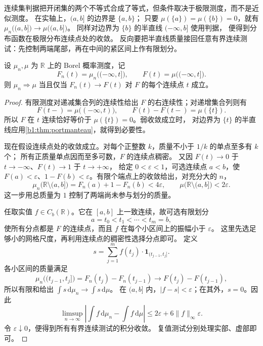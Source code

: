 连续集判据把开闭集的两个不等式合成了等式，但条件取决于极限测度，而不是近似测度。
在实轴上，\((a,b]\) 的边界是 \(\{a,b\}\)；
只要 \(\mu(\{a\})=\mu(\{b\})=0\)，就有
\(\mu_n\bigl((a,b]\bigr)\to\mu\bigl((a,b]\bigr)\)。
同样对边界为 \(\{b\}\) 的半直线 \(( -\infty,b]\) 使用判据，
便得到分布函数在极限分布连续点处的收敛。
反向要把半直线质量接回任意有界连续测试：先控制两端尾部，再在中间的紧区间上作有限划分。

\begin{proposition}[实轴上的分布函数判据]\label{b1:prop:cdf-weak-convergence}
设 \(\mu_n,\mu\) 为 \(\mathbb R\) 上的 Borel 概率测度，记
\[
 F_n(t)=\mu_n\bigl((-\infty,t]\bigr),\qquad
 F(t)=\mu\bigl((-\infty,t]\bigr).
\]
则 \(\mu_n\Rightarrow\mu\) 当且仅当 \(F_n(t)\to F(t)\) 对 \(F\) 的每个连续点 \(t\) 成立。
\end{proposition}
\begin{proof}
有限测度对递减集合列的连续性给出 \(F\) 的右连续性；对递增集合列则有
\[
 F(t-)=\mu\bigl((-\infty,t)\bigr),\qquad
 F(t)-F(t-)=\mu(\{t\}).
\]
所以 \(F\) 在 \(t\) 连续恰好等价于 \(\mu(\{t\})=0\)。弱收敛成立时，
对边界为 \(\{t\}\) 的半直线应用\cref{b1:thm:portmanteau}，就得到必要性。

现在假设连续点处的收敛成立。对每个正整数 \(k\)，质量不小于 \(1/k\) 的单点至多有 \(k\) 个；
所有正质量单点因而至多可数，\(F\) 的连续点稠密。
又因 \(F(t)\to0\) 于 \(t\to-\infty\)、\(F(t)\to1\) 于 \(t\to+\infty\)，
给定 \(0<\varepsilon<1\)，可选连续点 \(a<b\)，使
\(F(a)<\varepsilon\)、\(1-F(b)<\varepsilon\)。有限个端点上的收敛给出，对充分大的 \(n\)，
\[
 \mu_n\bigl(\mathbb R\setminus(a,b]\bigr)
 =F_n(a)+1-F_n(b)<4\varepsilon,\qquad
 \mu\bigl(\mathbb R\setminus(a,b]\bigr)<2\varepsilon.
\]
这一步用总质量为 \(1\) 控制了两端尚未参与划分的质量。

任取实值 \(f\in C_b(\mathbb R)\)。它在 \([a,b]\) 上一致连续，故可选有限划分
\[
 a=t_0<t_1<\cdots<t_m=b,
\]
使所有分点都是 \(F\) 的连续点，而且 \(f\) 在每个小区间上的振幅小于 \(\varepsilon\)。
这里先选足够小的网格尺度，再利用连续点的稠密性选择分点即可。
定义
\[
 s=\sum_{j=1}^m f(t_j)\cdot\mathbf1_{(t_{j-1},t_j]}.
\]
各小区间的质量满足
\[
 \mu_n\bigl((t_{j-1},t_j]\bigr)
 =F_n(t_j)-F_n(t_{j-1})
 \longrightarrow F(t_j)-F(t_{j-1}),
\]
所以有限和给出 \(\int s\,\mathrm d\mu_n\to\int s\,\mathrm d\mu\)。
在 \((a,b]\) 内，\(|f-s|<\varepsilon\)；在其外，\(s=0\)。因此
\[
 \limsup_{n\to\infty}
 \left|\int f\,\mathrm d\mu_n-\int f\,\mathrm d\mu\right|
 \le 2\varepsilon+6\|f\|_\infty\varepsilon.
\]
令 \(\varepsilon\downarrow0\)，便得到所有有界连续测试的积分收敛。
复值测试分别处理实部、虚部即可。
\end{proof}

